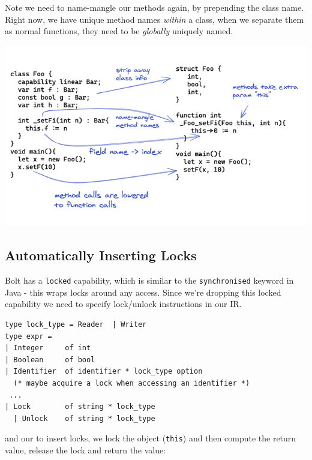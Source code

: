 Note we need to name-mangle our methods again, by prepending the class
name. Right now, we have unique method names \emph{within} a class, when
we separate them as normal functions, they need to be \emph{globally}
uniquely named.

{
\href{https://mukulrathi.com/static/c42e7c83dd7245e132403d79cf89c41e/fa60d/lower-classes.png}{{}
\includegraphics[width=\linewidth]{06_files/lower-classes.png}} }

\hypertarget{automatically-inserting-locks}{%
\subsection{\texorpdfstring{\protect\hyperlink{automatically-inserting-locks}{}Automatically
Inserting
Locks}{Automatically Inserting Locks}}\label{automatically-inserting-locks}}

Bolt has a \texttt{locked} capability, which is similar to the
\texttt{synchronised} keyword in Java - this wraps locks around any
access. Since we're dropping this locked capability we need to specify
lock/unlock instructions in our IR.
%
%

\begin{lstlisting}[language=caml,caption={frontend\_ir.mli}]
type lock_type = Reader  | Writer
type expr =  
| Integer     of int  
| Boolean     of bool  
| Identifier  of identifier * lock_type option
  (* maybe acquire a lock when accessing an identifier *) 
 ...  
| Lock        of string * lock_type
  | Unlock    of string * lock_type
\end{lstlisting}

and our to insert locks, we lock the object (\texttt{this}) and then
compute the return value, release the lock and return the value:

